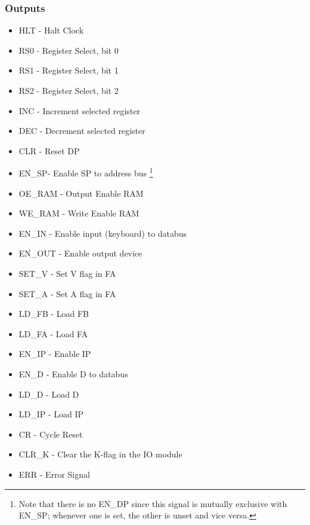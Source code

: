 \subsubsection*{Outputs}
\begin{itemize}
\itemsep0em 
\item HLT - Halt Clock
\item RS0 - Register Select, bit 0
\item RS1 - Register Select, bit 1
\item RS2 - Register Select, bit 2
\item INC - Increment selected register
\item DEC - Decrement selected register
\item CLR - Reset DP
\item EN\_SP- Enable SP to address bus \footnote{Note that there is no EN\_DP since this signal is mutually exclusive with EN\_SP; whenever one is set, the other is unset and vice versa.}
\item OE\_RAM - Output Enable RAM
\item WE\_RAM - Write Enable RAM
\item EN\_IN - Enable input (keyboard) to databus
\item EN\_OUT - Enable output device
\item SET\_V - Set V flag in FA
\item SET\_A - Set A flag in FA
\item LD\_FB - Load FB
\item LD\_FA - Load FA
\item EN\_IP - Enable IP
\item EN\_D - Enable D to databus
\item LD\_D - Load D
\item LD\_IP - Load IP
\item CR - Cycle Reset
\item CLR\_K - Clear the K-flag in the IO module
\item ERR - Error Signal
\end{itemize}


